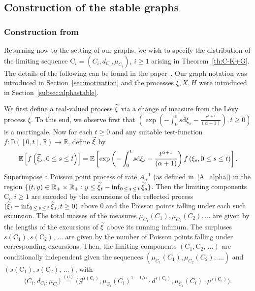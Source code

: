 \documentclass[10pt]{amsart}
\theoremstyle{definition}\newtheorem{defi}[theo]{Definition}\newtheorem{rema}[theo]{Remark}\newtheorem{exam}[theo]{Example}\newtheorem{exem}[theo]{Example}\newtheorem{nota}[theo]{Notation}
\newcommand{\E}[1]{\ensuremath{\mathbb{E} \left[#1 \right]}}
\newcommand{\equidist}{\ensuremath{\stackrel{\mathrm{(d)}}{=}}}
\newcommand{\rmd}{\mathrm{d}}
\newcommand{\rmC}{\mathrm{C}}
\newcommand{\cG}{\mathcal{G}}
\newcommand{\R}{\mathbb{R}}
\newcommand{\bbD}{\mathbb{D}}
\let\oldtilde\tilde
\renewcommand*{\tilde}[1]{\mathchoice{\widetilde{#1}}{\widetilde{#1}}{\oldtilde{#1}}{\oldtilde{#1}}}
\begin{document}
\subsection{Construction of the stable graphs}\label{sec:SLconfiguration}

\subsubsection{Construction from~\cite{CKG17+}}
Returning now to the setting of our graphs, we wish to specify the distribution of the limiting sequence $\rmC_i = (C_i, d_{C_i}, \mu_{C_i})$, $i \ge 1$ arising in Theorem~\ref{th:C-K+G}. The details of the following can be found in the paper~\cite{CKG17+}. Our graph notation was introduced in Section~\ref{sec:motivation} and the processes $\xi, X, H$ were introduced in Section~\ref{subsec:alphastable}.

We first define a real-valued process $\tilde{\xi}$ via a change of measure from the Lévy process $\xi$. To this end, we observe first that $(\exp(-\int_0^t s \rmd \xi_s - \frac{t^{\alpha+1}}{(\alpha+1)}), t \ge 0)$ is a martingale. Now for each $t \ge 0$ and any suitable test-function $f: \bbD([0,t], \R) \to \R$, define $\tilde{\xi}$ by
\[
\E{f\left(\tilde{\xi}_s, 0 \le s \le t\right)} = \E{\exp \left(-\int_0^t s \rmd \xi_s - \frac{t^{\alpha+1}}{(\alpha+1)} \right) f\left(\xi_s, 0 \le s \le t\right)}.
\]
Superimpose a Poisson point process of rate $A_{\alpha}^{-1}$ (as defined in~\eqref{A_alpha}) in the region $\{(t,y) \in \R_+ \times \R_+: y \le \tilde\xi_t - \inf_{0\,\le\,s\,\le\,t} \tilde \xi_s\}$. Then the limiting components $\rmC_i,i\geq 1$ are encoded by the excursions of the reflected process $(\tilde \xi_t - \inf_{0\,\le\,s\,\le\,t} \tilde \xi_s, t \ge 0)$ above 0 and the Poisson points falling under each such excursion. The total masses of the measures $\mu_{C_1}(C_1), \mu_{C_2}(C_2), \ldots$ are given by the lengths of the excursions of $\tilde{\xi}$ above its running infimum. The surpluses $s(\rmC_1), s(\rmC_2),\,\ldots$ are given by the number of Poisson points falling under corresponding excursions. Then, the limiting components $(\rmC_1, \rmC_2,\,\ldots)$ are conditionally independent given the sequences $(\mu_{C_1}(C_1), \mu_{C_2}(C_2),\,\ldots)$ and $(s(\rmC_1), s(\rmC_2),\,\ldots)$, with
\[
\big(C_i, d_{C_i}, \mu_{C_i} \big)\equidist \big(\cG^{s(\rmC_i)}, \mu_{C_i}(C_i)^{1-1/\alpha} \cdot d^{s(\rmC_i)}, \mu_{C_i}(C_i) \cdot \mu^{s(\rmC_i)}\big).
\]
\end{document}
